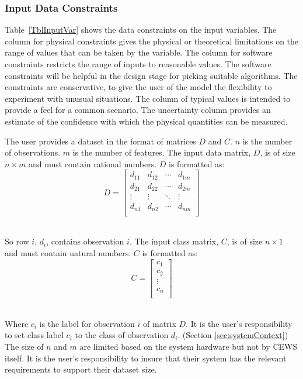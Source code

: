 \documentclass[12pt]{article}
\begin{document}
\subsubsection{Input Data Constraints} \label{sec:dataConstraints}    

Table~\ref{TblInputVar} shows the data constraints on the input variables.  
The column for physical constraints gives the physical or theoretical limitations on the range of values that can be taken by the variable. 
The column for software constraints restricts the range of inputs to reasonable values. 
The software constraints will be helpful in the design stage for picking suitable algorithms.  
The constraints are conservative, to give the user of the model the flexibility to experiment with unusual situations. 
The column of typical values is intended to provide a feel for a common scenario.  
The uncertainty column provides an estimate of the confidence with which the physical quantities can be measured.  

The user provides a dataset in the format of matrices $D$ and $C$. 
$n$ is the number of observations. 
$m$ is the number of features. 
The input data matrix, $D$, is of size $n \times m$ and  must contain rational numbers. $D$ is formatted as: \\
 \[
  D =
  \left[ {\begin{array}{cccc}
    d_{11} & d_{12} & \cdots & d_{1m}\\
    d_{21} & d_{22} & \cdots & d_{2m}\\
    \vdots & \vdots & \ddots & \vdots\\
    d_{n1} & d_{n2} & \cdots & d_{nm}\\
  \end{array} } \right]
\] \\
\begin{minipage}{\textwidth}
So row $i$, $d_i$, contains observation $i$.
The input class matrix, $C$, is of size $n \times 1$ and  must contain natural numbers. $C$ is formatted as: \\
 \[
  C =
  \left[ {\begin{array}{c}
    c_{1} \\
    c_{2} \\
    \vdots \\
    c_{n} \\
  \end{array} } \right]
\] \\
\end{minipage}
Where $c_i$ is the label for observation $i$ of matrix $D$. 
It is the user's responsibility to set class label $c_i$ to the class of observation $d_i$. (Section \ref{sec:systemContext})
The size of $n$ and $m$ are limited based on the system hardware but not by CEWS itself.
It is the user's responsibility to insure that their system has the relevant requirements to support their dataset size.
\end{document}
